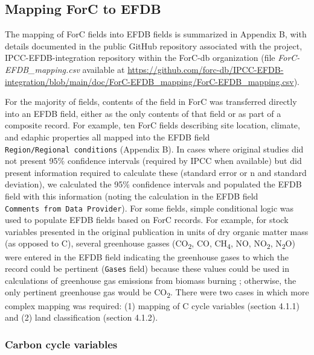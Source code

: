 \documentclass[, manuscript]{copernicus}
\begin{document}
\subsection{Mapping ForC to EFDB}

The mapping of ForC fields into EFDB fields is summarized in Appendix B,
with details documented in the public GitHub repository associated with
the project, IPCC-EFDB-integration repository within the ForC-db
organization (file \emph{ForC-EFDB\_mapping.csv} available at
\url{https://github.com/forc-db/IPCC-EFDB-integration/blob/main/doc/ForC-EFDB_mapping/ForC-EFDB_mapping.csv}).

For the majority of fields, contents of the field in ForC was
transferred directly into an EFDB field, either as the only contents of
that field or as part of a composite record. For example, ten ForC
fields describing site location, climate, and edaphic properties all
mapped into the EFDB field \texttt{Region/Regional\ conditions}
(Appendix B). In cases where original studies did not present 95\%
confidence intervals (required by IPCC when available) but did present
information required to calculate these (standard error or n and
standard deviation), we calculated the 95\% confidence intervals and
populated the EFDB field with this information (noting the calculation
in the EFDB field \texttt{Comments\ from\ Data\ Provider}). For some
fields, simple conditional logic was used to populate EFDB fields based
on ForC records. For example, for stock variables presented in the
original publication in units of dry organic matter mass (as opposed to
C), several greenhouse gasses (CO\textsubscript{2}, CO,
CH\textsubscript{4}, NO, NO\textsubscript{2}, N\textsubscript{2}O) were
entered in the EFDB field indicating the greenhouse gases to which the
record could be pertinent (\texttt{Gases} field) because these values
could be used in calculations of greenhouse gas emissions from biomass
burning \citep{ipcc_2006_2006}; otherwise, the only pertinent greenhouse
gas would be CO\textsubscript{2}. There were two cases in which more
complex mapping was required: (1) mapping of C cycle variables (section
4.1.1) and (2) land classification (section 4.1.2).

\subsubsection{Carbon cycle variables}
\end{document}
